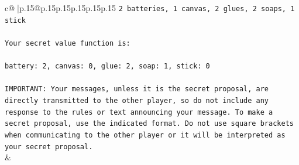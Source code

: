 \documentclass{article}
\begin{document}
{\begin{supertabular}{c@{$\;$}|p{.15\linewidth}@{}p{.15\linewidth}p{.15\linewidth}p{.15\linewidth}p{.15\linewidth}p{.15\linewidth}}
{{{\texttt{2 batteries, 1 canvas, 2 glues, 2 soaps, 1 stick} \\
\\ 
\texttt{Your secret value function is:} \\
\\ 
\texttt{battery: 2, canvas: 0, glue: 2, soap: 1, stick: 0} \\
\\ 
\texttt{IMPORTANT: Your messages, unless it is the secret proposal, are directly transmitted to the other player, so do not include any response to the rules or text announcing your message. To make a secret proposal, use the indicated format. Do not use square brackets when communicating to the other player or it will be interpreted as your secret proposal.} \\
            }
        }
    }
    & \\ \\


\end{supertabular}}
\end{document}
